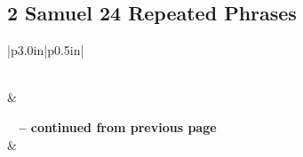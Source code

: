 \subsection{2 Samuel 24 Repeated Phrases}


\normalsize
 
\begin{center}
\begin{longtable}{|p{3.0in}|p{0.5in}|}
\caption[2 Samuel 24 Repeated Phrases]{2 Samuel 24 Repeated Phrases}\label{table:Repeated Phrases 2 Samuel 24} \\
\hline {} &  \\ \hline 
\endfirsthead
 
{{\bfseries \tablename\ \thetable{} -- continued from previous page}} \\  
\hline {} &  \\ \hline 
\endhead
 

\end{longtable}
\end{center}
